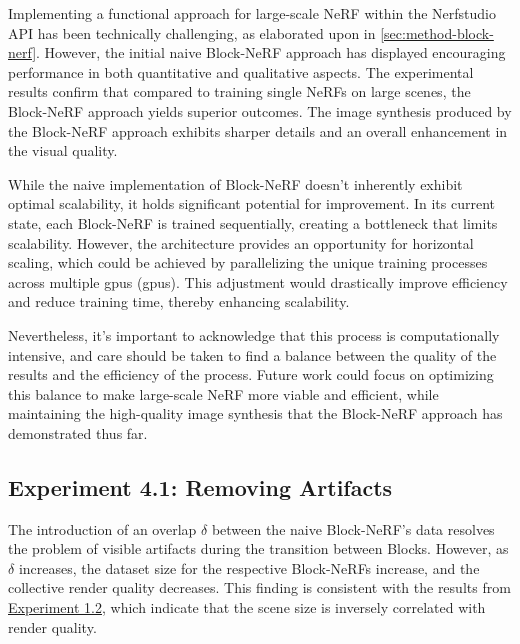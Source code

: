 Implementing a functional approach for large-scale NeRF within the Nerfstudio API has been technically challenging, as elaborated upon in \autoref{sec:method-block-nerf}. However, the initial naive Block-NeRF approach has displayed encouraging performance in both quantitative and qualitative aspects. The experimental results confirm that compared to training single NeRFs on large scenes, the Block-NeRF approach yields superior outcomes. The image synthesis produced by the Block-NeRF approach exhibits sharper details and an overall enhancement in the visual quality.

While the naive implementation of Block-NeRF doesn't inherently exhibit optimal scalability, it holds significant potential for improvement. In its current state, each Block-NeRF is trained sequentially, creating a bottleneck that limits scalability. However, the architecture provides an opportunity for horizontal scaling, which could be achieved by parallelizing the unique training processes across multiple \acrlong{gpu}s (\acrshort{gpu}s). This adjustment would drastically improve efficiency and reduce training time, thereby enhancing scalability.

Nevertheless, it's important to acknowledge that this process is computationally intensive, and care should be taken to find a balance between the quality of the results and the efficiency of the process. Future work could focus on optimizing this balance to make large-scale NeRF more viable and efficient, while maintaining the high-quality image synthesis that the Block-NeRF approach has demonstrated thus far.





\subsection{Experiment 4.1: Removing Artifacts}

The introduction of an overlap $\delta$ between the naive Block-NeRF's data resolves the problem of visible artifacts during the transition between Blocks. However, as $\delta$ increases, the dataset size for the respective Block-NeRFs increase, and the collective render quality decreases. This finding is consistent with the results from \hyperref[sec:exp-capacity]{Experiment 1.2}, which indicate that the scene size is inversely correlated with render quality.

